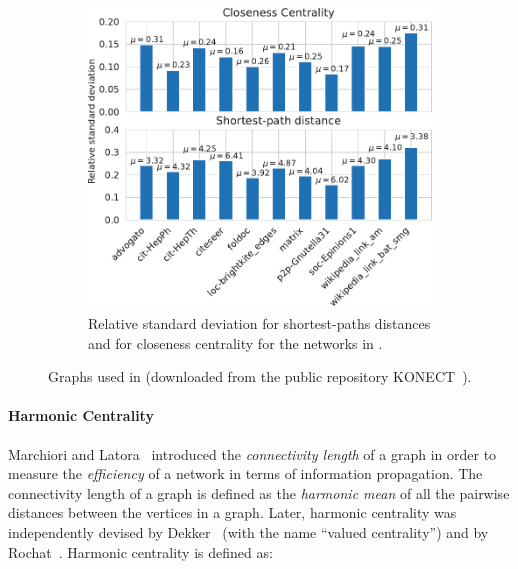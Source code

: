 \begin{figure}[t!]
\centering
\begin{minipage}[t]{.5\textwidth}
\centering
\begin{figure}[H]
\centering
\includegraphics[width=.9\textwidth]{sources/plots/preliminaries/sp-cc-rstd.pdf}
\caption{Relative standard deviation for shortest-paths distances and for
closeness centrality for the networks in .}
\label{fig:prelim:rstd}
\end{figure}
\end{minipage}\hfill
\begin{minipage}[t]{.5\textwidth}
\centering
\begin{table}[H]
\centering
\setlength{\tabcolsep}{3pt}
\scriptsize

\caption{Graphs used in  (downloaded from
the public repository KONECT~\cite{kunegis2013konect}).}
\label{tab:prelim:insts-rstd}
\end{table}
\end{minipage}
\end{figure}

\paragraph{Harmonic Centrality}
%
Marchiori and Latora~\cite{marchiori2000harmony} introduced the
\emph{connectivity length} of a graph in order to measure the \emph{efficiency}
of a network in terms of information propagation. The connectivity length of a
graph is defined as the \emph{harmonic mean} of all the pairwise distances
between the vertices in a graph.
Later, harmonic centrality was independently devised by
Dekker~\cite{DBLP:journals/joss/Dekker05} (with the name \enquote{valued
centrality}) and by Rochat~\cite{rochat2009closeness}.
Harmonic centrality is defined as:

